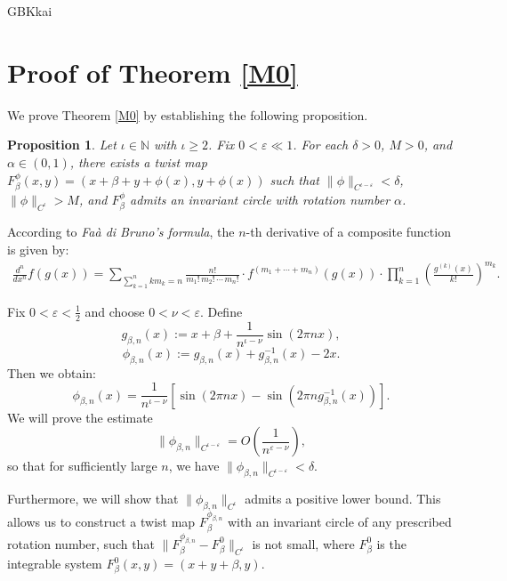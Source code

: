 \documentclass{amsart}
\newcommand{\N}{\mathbb{N}}
\newtheorem{Proposition}[Definition]{Proposition}
\theoremstyle{definition}
\begin{document}
\begin{CJK*}{GBK}{kai}
\section{\sc Proof of Theorem \ref{M0}}
		We prove Theorem \ref{M0} by establishing the following  proposition.

\begin{Proposition}\label{SSR}
Let $\iota\in\N$ with $\iota\geq 2$. Fix $0<\varepsilon\ll 1$. For each  $\delta>0$, $M>0$, and $\alpha\in(0,1)$, there exists a twist map $F_\beta^\phi(x,y) = (x + \beta + y + \phi(x), y + \phi(x))$ such that $\|\phi\|_{C^{\iota-\varepsilon}} < \delta$, $\|\phi\|_{C^\iota} > M$, and $F_\beta^\phi$ admits an invariant circle with rotation number $\alpha$.
\end{Proposition}

\vspace{1ex}




According to \emph{Fa\`{a} di Bruno's formula}, the $n$-th derivative of a composite function is given by:
\begin{align*}
\frac{d^n}{dx^n} f(g(x)) = \sum_{\sum_{k=1}^n k m_k = n} \frac{n!}{m_1!\,m_2!\,\cdots\,m_n!}
\cdot f^{(m_1 + \cdots + m_n)}(g(x))
\cdot \prod_{k=1}^n \left(\frac{g^{(k)}(x)}{k!}\right)^{m_k}.
\end{align*}


Fix \( 0 < \varepsilon < \frac{1}{2} \) and choose \( 0 < \nu < \varepsilon \). Define
\[
g_{\beta,n}(x) := x + \beta + \frac{1}{n^{\iota-\nu}} \sin(2\pi n x),
\]
\[
\phi_{\beta,n}(x) := g_{\beta,n}(x) + g_{\beta,n}^{-1}(x) - 2x.
\]
Then we obtain:
\[
\phi_{\beta,n}(x) = \frac{1}{n^{\iota-\nu}}\left[\sin(2\pi n x) - \sin\left(2\pi n g_{\beta,n}^{-1}(x)\right)\right].
\]
We will prove the estimate
\[
\|\phi_{\beta,n}\|_{C^{\iota-\varepsilon}} = O\left(\frac{1}{n^{\varepsilon - \nu}}\right),
\]
so that for sufficiently large \( n \), we have \( \|\phi_{\beta,n}\|_{C^{\iota-\varepsilon}} < \delta \).

Furthermore, we will show that \( \|\phi_{\beta,n}\|_{C^\iota} \) admits a positive lower bound. This allows us to construct a twist map \( F_\beta^{\phi_{\beta,n}} \) with an invariant circle of any prescribed rotation number, such that \( \|F_\beta^{\phi_{\beta,n}} - F_\beta^0\|_{C^\iota} \) is not small, where \( F_\beta^0 \) is the integrable system \( F_\beta^0(x,y) = (x + y + \beta, y) \).


\end{CJK*}
\end{document}
